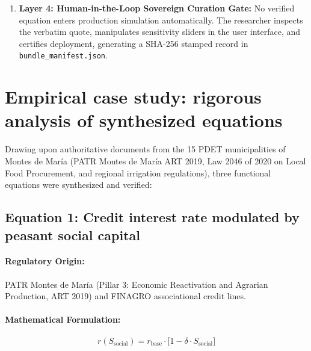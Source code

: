 \documentclass[11pt,a4paper]{article}
\begin{document}
\begin{enumerate}[leftmargin=*]
    \item \textbf{Layer 4: Human-in-the-Loop Sovereign Curation Gate:}
    No verified equation enters production simulation automatically. The researcher inspects the verbatim quote, manipulates sensitivity sliders in the user interface, and certifies deployment, generating a SHA-256 stamped record in \texttt{bundle\_manifest.json}.
\end{enumerate}

\section{Empirical case study: rigorous analysis of synthesized equations}

Drawing upon authoritative documents from the 15 PDET municipalities of Montes de Mar\'ia (PATR Montes de Mar\'ia ART 2019, Law 2046 of 2020 on Local Food Procurement, and regional irrigation regulations), three functional equations were synthesized and verified:

\subsection{Equation 1: Credit interest rate modulated by peasant social capital}

\paragraph{Regulatory Origin:} PATR Montes de Mar\'ia (Pillar 3: Economic Reactivation and Agrarian Production, ART 2019) and FINAGRO associational credit lines.

\paragraph{Mathematical Formulation:}
\begin{equation}
    r(S_{\text{social}}) = r_{\text{base}} \cdot \Big[1 - \delta \cdot S_{\text{social}}\Big]
\end{equation}
\end{document}
